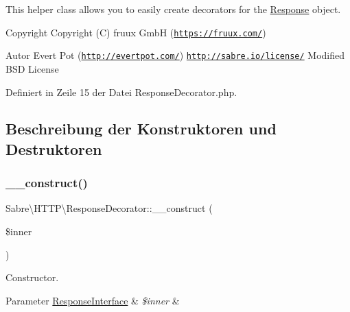 This helper class allows you to easily create decorators for the \mbox{\hyperlink{class_sabre_1_1_h_t_t_p_1_1_response}{Response}} object.

\begin{DoxyCopyright}{Copyright}
Copyright (C) fruux GmbH (\href{https://fruux.com/}{\tt https\+://fruux.\+com/}) 
\end{DoxyCopyright}
\begin{DoxyAuthor}{Autor}
Evert Pot (\href{http://evertpot.com/}{\tt http\+://evertpot.\+com/})  \href{http://sabre.io/license/}{\tt http\+://sabre.\+io/license/} Modified B\+SD License 
\end{DoxyAuthor}


Definiert in Zeile 15 der Datei Response\+Decorator.\+php.



\subsection{Beschreibung der Konstruktoren und Destruktoren}
\mbox{\label{class_sabre_1_1_h_t_t_p_1_1_response_decorator_a892f76d8a12c9133093843e4f49dacef}} 
\subsubsection{\texorpdfstring{\+\_\+\+\_\+construct()}{\_\_construct()}}
{\footnotesize\ttfamily Sabre\textbackslash{}\+H\+T\+T\+P\textbackslash{}\+Response\+Decorator\+::\+\_\+\+\_\+construct (\begin{DoxyParamCaption}\item[{\mbox{\hyperlink{interface_sabre_1_1_h_t_t_p_1_1_response_interface}{Response\+Interface}}}]{\$inner }\end{DoxyParamCaption})}

Constructor.


\begin{DoxyParams}[1]{Parameter}
\mbox{\hyperlink{interface_sabre_1_1_h_t_t_p_1_1_response_interface}{Response\+Interface}} & {\em \$inner} & \\
\hline
\end{DoxyParams}


